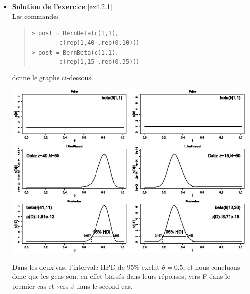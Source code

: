 \begin{itemize}
\item \textbf{Solution de l'exercice }\ref{ex4.2.1} \\
Les commandes 
\begin{quote}
\small \texttt{> post = BernBeta(c(1,1),  \\ 
\ \ \ \ \ \ \ \  c(rep(1,40),rep(0,10)))}\\
\texttt{> post = BernBeta(c(1,1),    \\
\ \ \ \ \ \ \ \   c(rep(1,15),rep(0,35)))} \normalsize
\end{quote}
donne le graphe ci-dessous.
\begin{center}
		\includegraphics[width=\linewidth]{Images/exsection4.png}
\end{center}
Dans les deux cas, l'intervale HPD de 95\% exclut $\theta=0.5$, et nous concluons donc que les gens sont en effet biais\'es dans leurs r\'eponses, vers F dans le premier cas et vers J dans le second cas. 
\end{itemize}
